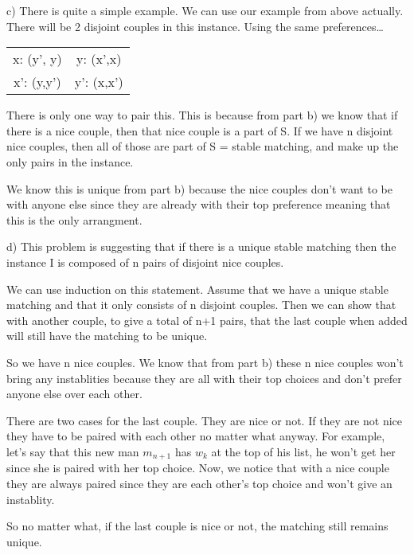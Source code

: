 \documentclass{article}
\begin{document}
\vspace{3mm}

c) There is quite a simple example. We can use our example from above actually. There will be 2 disjoint couples in this instance.
Using the same preferences\dots

\begin{center}
    \begin{tabular}{ c c  }
        x: (y', y) & y: (x',x) \\ 
        x': (y,y') & y': (x,x')  \\     
    \end{tabular}
    \end{center}

There is only one way to pair this. This is because from part b) we know that if there is a nice couple, then that nice couple is a part of S. 
If we have n disjoint nice couples, then all of those are part of S = stable matching, and make up the only pairs in the instance. 

We know this is unique from part b) because the nice couples don't want to be with anyone else since they are already with their top preference meaning that this is the only arrangment. 


\vspace{3mm}
d) This problem is suggesting that if there is a unique stable matching then the instance I is composed of n pairs of disjoint nice couples. 
 
We can use induction on this statement. Assume that we have a unique stable matching and that it only consists of n disjoint couples. 
Then we can show that with another couple, to give a total of n+1 pairs, that the last couple when added will still have the matching to be unique. 

So we have n nice couples. We know that from part b) these n nice couples won't bring any instablities because they are all with their top choices and don't prefer anyone else over each other. 

There are two cases for the last couple. They are nice or not. If they are not nice they have to be paired with each other no matter what anyway. For example, let's say that this new man $m_{n+1}$ has $w_k$ at the top of his list, he won't get her since she is paired with her top choice.
Now, we notice that with a nice couple they are always paired since they are each other's top choice and won't give an instablity. 

So no matter what, if the last couple is nice or not, the matching still remains unique. 
\end{document}
